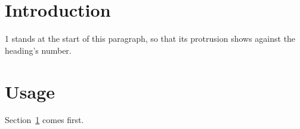 \documentclass{scrartcl}
\begin{document}
\section{Introduction}\label{intro}
1 stands at the start of this paragraph, so that its protrusion shows against the heading's number.
\section{Usage}
Section~\ref{intro} comes first.
\end{document}
